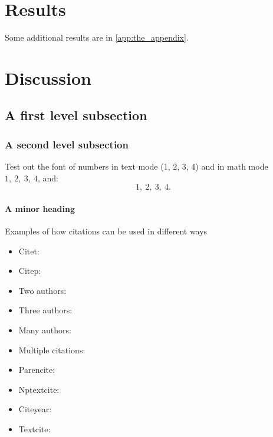 \documentclass{mpi-aebr}
\begin{document}
\section{Results}

Some additional results are in \autoref{app:the_appendix}.

\section{Discussion}

\subsection{A first level subsection}
\subsubsection{A second level subsection}

Test out the font of  numbers in text mode (1, 2, 3, 4) and in math mode $1,\ 2,\ 3,\ 4$, and:
$$
1,\ 2,\ 3,\ 4 .
$$

\lipsum[3]


\paragraph{A minor heading}
\lipsum[5]

Examples of how citations can be used in different ways

\begin{itemize}
  \item Citet: \citet{baker_nzclassification_2010}
  \item Citep: \citep{doc_sealion_2009}
  \item Two authors: \citet{abraham_summary_98-09}
  \item Three authors: \citep{thompson_dolphin_2013}
  \item Many authors: \citep{baker_global_2007}
  \item Multiple citations: \citep{baker_global_2007, abraham_summary_98-09, gales_phocarctos_2008}
  \item Parencite: \parencite{gales_phocarctos_2008}
  \item Nptextcite: 
  \item Citeyear: \citeyear{robertson_population_2011}
  \item Textcite: \textcite{roe_necropsy_2007}
\end{itemize}
\end{document}
